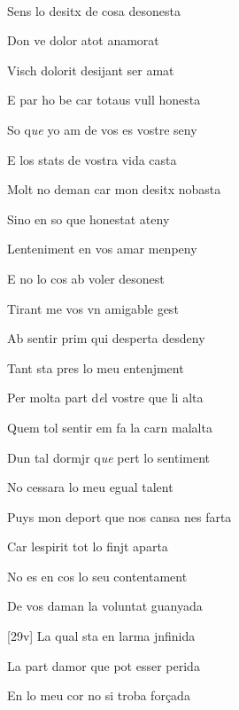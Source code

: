 \documentclass[12pt]{article}
\renewcommand{\espaiAbansEtiquetaPoema}{\vspace{0ex}}
\begin{document}
\begin{estrofa}

\espaiAbansEtiquetaPoema

\\

\end{estrofa}


\begin{estrofa}

 Sens lo desitx de cosa desonesta

 Don ve dolor atot anamorat

 Visch dolorit desijant ser amat

 E par ho be car totaus vull honesta

 So q\textit{ue} yo am de vos es vostre seny

 E los stats de vostra vida casta

 Molt no deman car mon desitx nobasta

 Sino en so que honestat ateny

\end{estrofa}



\begin{estrofa}

 Lenteniment en vos amar menpeny

 E no lo cos ab voler desonest

 Tirant me vos vn amigable gest

 Ab sentir prim qui desperta desdeny

 Tant sta pres lo meu entenjment

 Per molta part d\textit{e}l vostre que li alta

 Quem tol sentir em fa la carn malalta

 Dun tal dormjr q\textit{ue} pert lo sentiment

\end{estrofa}



\begin{estrofa}

 No cessara lo meu egual talent

 Puys mon deport que nos cansa nes farta

 Car lespirit tot lo finjt aparta

 No es en cos lo seu contentament

 De vos daman la voluntat guanyada

 [29v] La qual sta en larma jnfinida

 La part damor que pot esser perida

 En lo meu cor no si troba for\c{c}ada

\end{estrofa}
\end{document}
